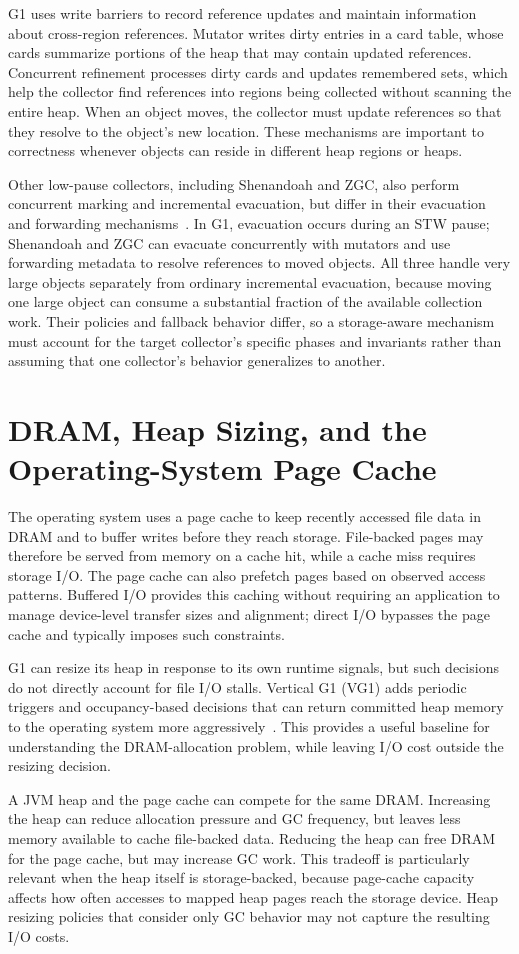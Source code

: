 G1 uses write barriers to record reference updates and maintain information about cross-region references.
Mutator writes dirty entries in a card table, whose cards summarize portions of the heap that may contain updated references.
Concurrent refinement processes dirty cards and updates remembered sets, which help the collector find references into regions being collected without scanning the entire heap.
When an object moves, the collector must update references so that they resolve to the object's new location.
These mechanisms are important to correctness whenever objects can reside in different heap regions or heaps.

Other low-pause collectors, including Shenandoah and ZGC, also perform concurrent marking and incremental evacuation, but differ in their evacuation and forwarding mechanisms~\cite{flood:shenandoah, yang:zgc}.
In G1, evacuation occurs during an STW pause; Shenandoah and ZGC can evacuate concurrently with mutators and use forwarding metadata to resolve references to moved objects.
All three handle very large objects separately from ordinary incremental evacuation, because moving one large object can consume a substantial fraction of the available collection work.
Their policies and fallback behavior differ, so a storage-aware mechanism must account for the target collector's specific phases and invariants rather than assuming that one collector's behavior generalizes to another.

\section{DRAM, Heap Sizing, and the Operating-System Page Cache}

The operating system uses a page cache to keep recently accessed file data in DRAM and to buffer writes before they reach storage.
File-backed pages may therefore be served from memory on a cache hit, while a cache miss requires storage I/O.
The page cache can also prefetch pages based on observed access patterns.
Buffered I/O provides this caching without requiring an application to manage device-level transfer sizes and alignment; direct I/O bypasses the page cache and typically imposes such constraints.

G1 can resize its heap in response to its own runtime signals, but such decisions do not directly account for file I/O stalls.
Vertical G1 (VG1) adds periodic triggers and occupancy-based decisions that can return committed heap memory to the operating system more aggressively~\cite{bruno:resize, jep346}.
This provides a useful baseline for understanding the DRAM-allocation problem, while leaving I/O cost outside the resizing decision.

A JVM heap and the page cache can compete for the same DRAM.
Increasing the heap can reduce allocation pressure and GC frequency, but leaves less memory available to cache file-backed data.
Reducing the heap can free DRAM for the page cache, but may increase GC work.
This tradeoff is particularly relevant when the heap itself is storage-backed, because page-cache capacity affects how often accesses to mapped heap pages reach the storage device.
Heap resizing policies that consider only GC behavior may not capture the resulting I/O costs.
